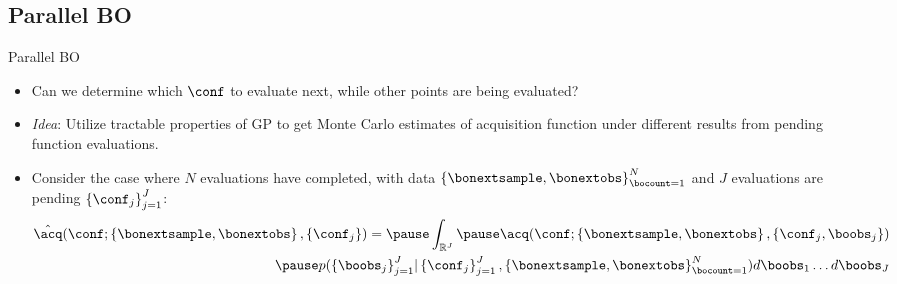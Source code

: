 \subsection{Parallel BO}
\begin{frame}[c]{Parallel BO}

\begin{itemize}
    \item Can we determine which $\conf$ to evaluate next, while other points are being evaluated? \pause
    \item \emph{Idea}: Utilize tractable properties of GP to get Monte Carlo estimates of acquisition function under different results from pending function evaluations. \pause
    \item Consider the case where $N$ evaluations have completed, with data $\left \{\bonextsample, \bonextobs \right \}^{N}_{\bocount = 1}$ and $J$ evaluations are pending $\left \{\conf_{j} \right \}^{J}_{j = 1}$: \pause
    \begin{equation*}
        \begin{aligned}
            \hat{\acq} ( \conf; \left \{ \bonextsample, \bonextobs \right \}, \left \{ \conf_j \right \} ) =  \pause
            \int_{\mathbb{R}^J}  \pause \acq ( \conf; \left \{ \bonextsample, \bonextobs \right \}, \left \{ \conf_j, \boobs_j \right \} ) \\  \pause
            p(\left \{ \boobs_j \right \}^{J}_{j = 1}  \rvert \left \{ \conf_j \right \}^{J}_{j = 1}, \left \{ \bonextsample, \bonextobs \right \}^{N}_{\bocount=1} )d\boobs_1 \dots d\boobs_J
        \end{aligned}
        \end{equation*}
\end{itemize}


\end{frame}

